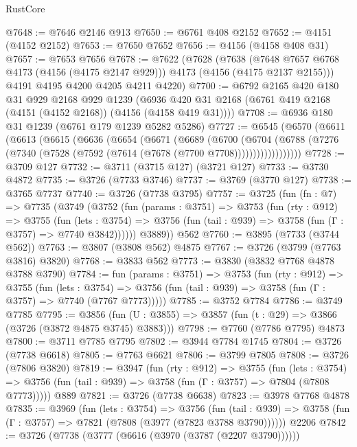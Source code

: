 \begin{lexlean}{RustCore}
\begin{coremodule}
@7648 := @7646 @2146 @913
@7650 := @6761 @408 @2152
@7652 := @4151 (@4152 @2152)
@7653 := @7650 @7652
@7656 := @4156 (@4158 @408 @31)
@7657 := @7653 @7656
@7678 := @7622
    (@7628
      (@7638 (@7648 @7657 @6768 @4173 (@4156 (@4175 @2147 @929))) @4173 (@4156 (@4175 @2137 @2155)))
      @4191
      @4195
      @4200
      @4205
      @4211
      @4220)
@7700 := @6792
    @2165
    @420
    @180
    @31
    @929
    @2168
    @929
    @1239
    (@6936 @420 @31 @2168 (@6761 @419 @2168 (@4151 (@4152 @2168)) (@4156 (@4158 @419 @31))))
@7708 := @6936 @180 @31 @1239 (@6761 @179 @1239 @5282 @5286)
@7727 := @6545
    (@6570
      (@6611
        (@6613
          (@6615
            (@6636
              (@6654
                (@6671
                  (@6689
                    (@6700
                      (@6704
                        (@6788
                          (@7276 (@7340 (@7528 (@7592 (@7614 (@7678 (@7700 @7708))))))))))))))))))
@7728 := @3709 @127
@7732 := @3711 (@3715 @127) (@3721 @127)
@7733 := @3730 @4872
@7735 := @3726 (@7733 @3746)
@7737 := @3769 (@3770 @127)
@7738 := @3765 @7737
@7740 := @3726 (@7738 @3795)
@7757 := @3725
    (fun (fn : @7) =>
    @7735
      (@3749
        (@3752
          (fun (params : @3751) =>
          @3753
            (fun (rty : @912) =>
            @3755
              (fun (lets : @3754) =>
              @3756 (fun (tail : @939) => @3758 (fun (Γ : @3757) => @7740 @3842))))))
        @3889))
    @562
@7760 := @3895 (@7733 (@3744 @562))
@7763 := @3807 (@3808 @562) @4875
@7767 := @3726 (@3799 (@7763 @3816) @3820)
@7768 := @3833 @562
@7773 := @3830 (@3832 @7768 @4878 @3788 @3790)
@7784 := fun (params : @3751) =>
  @3753
    (fun (rty : @912) =>
    @3755
      (fun (lets : @3754) =>
      @3756 (fun (tail : @939) => @3758 (fun (Γ : @3757) => @7740 (@7767 @7773)))))
@7785 := @3752 @7784
@7786 := @3749 @7785
@7795 := @3856 (fun (U : @3855) => @3857 (fun (t : @29) => @3866 (@3726 (@3872 @4875 @3745) @3883)))
@7798 := @7760 (@7786 @7795) @4873
@7800 := @3711 @7785 @7795
@7802 := @3944 @7784 @1745
@7804 := @3726 (@7738 @6618)
@7805 := @7763 @6621
@7806 := @3799 @7805
@7808 := @3726 (@7806 @3820)
@7819 := @3947
    (fun (rty : @912) =>
    @3755
      (fun (lets : @3754) =>
      @3756 (fun (tail : @939) => @3758 (fun (Γ : @3757) => @7804 (@7808 @7773)))))
    @889
@7821 := @3726 (@7738 @6638)
@7823 := @3978 @7768 @4878
@7835 := @3969
    (fun (lets : @3754) =>
    @3756
      (fun (tail : @939) => @3758 (fun (Γ : @3757) => @7821 (@7808 (@3977 (@7823 @3788 @3790))))))
    @2206
@7842 := @3726 (@7738 (@3777 (@6616 (@3970 (@3787 (@2207 @3790))))))

\end{coremodule}
\end{lexlean}
